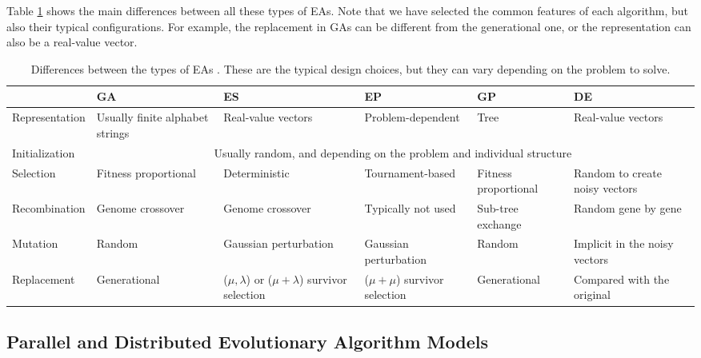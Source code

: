 \documentclass{article}
\begin{document}
Table \ref{tab:summaryEAs} shows the main differences between all
these types of EAs. Note that we have selected the common features of
each algorithm, but also their typical configurations. For example,
the replacement in GAs can be different from the generational one, or
the representation can also be a real-value vector.

\begin{table}
  \centering
\begin{tabular}{|p{2.2cm}|p{2.1cm}|p{2.1cm}|p{2.1cm}|p{2.1cm}|p{2.1cm}|}
\hline
				& GA 	 & ES  & EP & GP & DE  \\
\hline\hline
Representation  & Usually finite alphabet strings & Real-value vectors  & Problem-dependent			& Tree 				         & Real-value vectors 	 \\ \hline
Initialization  & \multicolumn{5}{c|}{Usually random, and depending on the problem and individual structure} 						 \\ \hline
Selection 	    & Fitness proportional 	          & Deterministic	      & Tournament-based       & Fitness proportional & Random to create noisy vectors \\ \hline
Recombination   & Genome crossover		            & Genome crossover		& Typically not used	  & Sub-tree exchange		 & Random gene by gene			\\ \hline
Mutation  		 & Random 				                  & Gaussian perturbation	& Gaussian perturbation& Random 				       & Implicit in the noisy vectors	 \\ \hline
Replacement		 & Generational	                    & ($\mu,\lambda$) or ($\mu + \lambda$) survivor selection & 	($\mu + \mu$) survivor selection    & Generational 			   & Compared with the original \\
\hline
\end{tabular}

\caption{Differences between the types of EAs \cite{eiben2010whatis}. These are the typical design choices, but they can vary depending on the problem to solve.}
\label{tab:summaryEAs}
\end{table}




\subsection{Parallel and Distributed Evolutionary Algorithm Models}
\label{subsec:eas-distributed:parallel}
\end{document}
